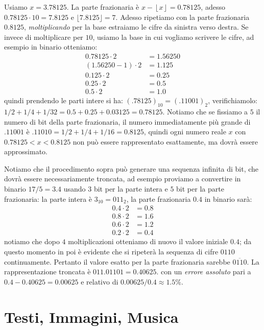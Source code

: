 \begin{ex} Usiamo $x = 3.78125$. La parte frazionaria è $x-\left\lfloor x \right \rfloor = 0.78125$, adesso
$0.78125\cdot 10 = 7.8125$ e $\lfloor 7.8125 \rfloor = 7$. 
Adesso ripetiamo con la parte frazionaria $0.8125$, \emph{moltiplicando} per la base estraiamo le cifre da sinistra verso destra.
Se invece di moltiplicare per $10$, usiamo la base in cui vogliamo scrivere le
cifre, ad esempio in binario otteniamo:
\begin{align*}
		 0.78125 \cdot 2 &= 1.56250\\
		 (1.56250-1) \cdot 2 &= 1.125\\
		 0.125 \cdot 2 &= 0.25\\
		 0.25  \cdot 2 &= 0.5\\
		 0.5 \cdot 2 &= 1.0
\end{align*}
quindi prendendo le parti intere si ha: $(.78125)_{10} = (.11001)_2$, verifichiamolo: $1/2+1/4+1/32 = 0.5 + 0.25 + 0.03125 = 0.78125$. Notiamo che se fissiamo a $5$ il numero di bit della parte frazionaria, il numero immediatamente più grande di $.11001$ è $.11010 = 1/2 + 1/4 + 1/16 = 0.8125$, quindi ogni numero reale $x$ con $0.78125  < x < 0.8125$ non può essere rappresentato esattamente, ma dovrà essere approssimato.

Notiamo che il procedimento sopra può generare una sequenza infinita di bit, che dovrà essere necessariamente troncata, ad esempio proviamo a convertire
in binario $17/5 = 3.4$ usando $3$ bit per la parte intera e $5$ bit
per la parte frazionaria: la parte intera è $3_{10} = 011_{2}$, la parte frazionaria $0.4$ in binario sarà:
\begin{align*}
		 0.4 \cdot 2 &= 0.8\\
		 0.8 \cdot 2 &= 1.6\\
		 0.6 \cdot 2 &= 1.2\\
		 0.2 \cdot 2 &= \mathbf{0.4}
\end{align*}
notiamo che dopo $4$ moltiplicazioni otteniamo di nuovo il valore iniziale $0.4$; da questo momento in poi è evidente che si ripeterà la sequenza di cifre $0110$ continuamente. Pertanto il valore esatto per la parte frazionaria sarebbe $\overline{0110}$. La rappresentazione troncata è $011.01101 = 0.40625$.
con un \emph{errore assoluto} pari a $0.4 - 0.40625 = 0.00625$ e relativo di $0.00625/0.4 \approx 1.5\%$.
\end{ex}



\section{Testi, Immagini, Musica}
